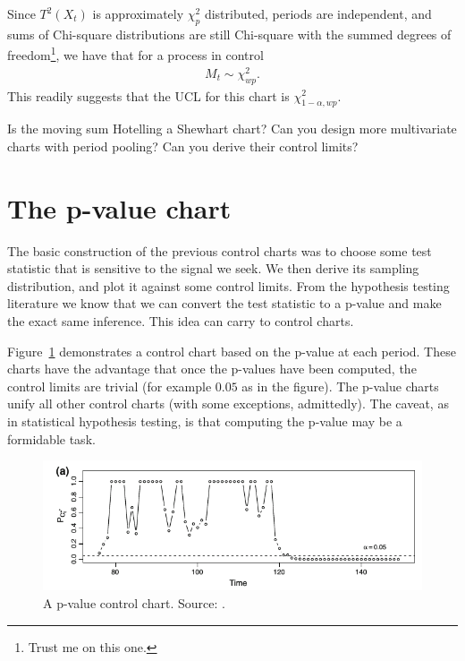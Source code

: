 Since $T^2(X_t)$ is approximately $\chi^2_p$ distributed, periods are independent, and sums of Chi-square distributions are still Chi-square with the summed degrees of freedom\footnote{Trust me on this one.}, we have that for a process in control
\begin{align}
	M_t \sim \chi^2_{wp}.
\end{align}
This readily suggests that the UCL for this chart is $\chi^2_{1-\alpha,wp}$. 

\begin{think}
Is the moving sum Hotelling a Shewhart chart? 
Can you design more multivariate charts with period pooling? 
Can you derive their control limits?
\end{think}





\section{The p-value chart}
The basic construction of the previous control charts was to choose some test statistic that is sensitive to the signal  we seek. We then derive its sampling distribution, and plot it against some control limits. 
From the hypothesis testing literature we know that we can convert the test statistic to a p-value and make the exact same inference. 
This idea can carry to control charts.

Figure~\ref{fig:p-value-chart} demonstrates a control chart based on the p-value at each period.
These charts have the advantage that once the p-values have been computed, the control limits are trivial (for example $0.05$ as in the figure).
The p-value charts unify all other control charts (with some exceptions, admittedly). 
The caveat, as in statistical hypothesis testing, is that computing the p-value may be a formidable task. 

\begin{figure}[t]
\centering
\includegraphics[width=0.7\linewidth]{art/p-value-chart}
\caption{A p-value control chart. Source: \cite{li_using_2012}.}
\label{fig:p-value-chart}
\end{figure}





